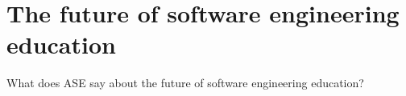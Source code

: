 \section{The future of software engineering education}

What does ASE say about the future of software engineering education?

